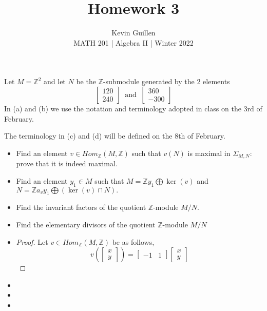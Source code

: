 \documentclass[11pt]{article}
\newenvironment{problem}[2][Problem\!]{\begin{trivlist}
\item[\hskip \labelsep {\bfseries #1}\hskip \labelsep {\bfseries #2}]}{\end{trivlist}}
\newcommand{\zz}{\mathbb Z}   %
\begin{document}
 
\title{Homework 3}
\author{Kevin Guillen\\[0.5em]
MATH 201 | Algebra II | Winter 2022}
\date{} 
\maketitle


\begin{tcolorbox}
  \begin{problem} {1}
    Let $M = \zz^2$ and let $N$ be the $\zz$-submodule generated by the 2 elements 
    \[\begin{bmatrix}
        120 \\ 240
    \end{bmatrix} \ \text{ and } \ \begin{bmatrix}
        360 \\ -300
    \end{bmatrix}\]
    In (a) and (b) we use the notation and terminology adopted in class on the 3rd of February.

    The terminology in (c) and (d) will be defined on the 8th of February.
    \begin{itemize}
      \item[(a)]
        Find an element $v \in Hom_\zz(M,\zz)$ such that $v(N)$ is maximal in $\Sigma_{M,N}$: prove that it is indeed maximal. 
      \item[(b)]
        Find an element $y_1 \in M$ such that $M = \zz{y_1} \bigoplus \ker(v)$ and $N = \zz a_v y_1 \bigoplus (\ker(v) \cap N).$ 
      \item[(c)]
        Find the invariant factors of the quotient $\zz$-module $M/N$. 
      \item[(d)]   
        Find the elementary divisors of the quotient $\zz$-module $M/N$ 
    \end{itemize}
  \end{problem}
\end{tcolorbox}

\begin{itemize}
  \item[(a)]
  \begin{proof}
    Let $v \in Hom_\zz(M,\zz)$ be as follows,
    \[v\left(\begin{bmatrix}
      x \\ y
    \end{bmatrix}\right) = \begin{bmatrix}
      -1 & 1 
    \end{bmatrix}\begin{bmatrix}
      x \\y
    \end{bmatrix}\]
  \end{proof} 
  \item[(b)]
  \item[(c)]
  \item[(d)]   
\end{itemize}
\end{document}

